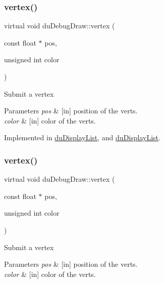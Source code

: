 \subsubsection{\texorpdfstring{vertex()}{vertex()}\hspace{0.1cm}{\footnotesize\ttfamily [1/8]}}
{\footnotesize\ttfamily virtual void du\+Debug\+Draw\+::vertex (\begin{DoxyParamCaption}\item[{const float $\ast$}]{pos,  }\item[{unsigned int}]{color }\end{DoxyParamCaption})\hspace{0.3cm}{\ttfamily [pure virtual]}}

Submit a vertex 
\begin{DoxyParams}{Parameters}
{\em pos} & \mbox{[}in\mbox{]} position of the verts. \\
\hline
{\em color} & \mbox{[}in\mbox{]} color of the verts. \\
\hline
\end{DoxyParams}


Implemented in \hyperlink{classduDisplayList_ab4aa562f713485769b68d1989c6e1ec4}{du\+Display\+List}, and \hyperlink{classduDisplayList_a5560d17b5190f75733154af2610ed83f}{du\+Display\+List}.

\mbox{\label{structduDebugDraw_a8fac1072846b60be4ce4810c68140ee8}} 
\subsubsection{\texorpdfstring{vertex()}{vertex()}\hspace{0.1cm}{\footnotesize\ttfamily [2/8]}}
{\footnotesize\ttfamily virtual void du\+Debug\+Draw\+::vertex (\begin{DoxyParamCaption}\item[{const float $\ast$}]{pos,  }\item[{unsigned int}]{color }\end{DoxyParamCaption})\hspace{0.3cm}{\ttfamily [pure virtual]}}

Submit a vertex 
\begin{DoxyParams}{Parameters}
{\em pos} & \mbox{[}in\mbox{]} position of the verts. \\
\hline
{\em color} & \mbox{[}in\mbox{]} color of the verts. \\
\hline
\end{DoxyParams}


